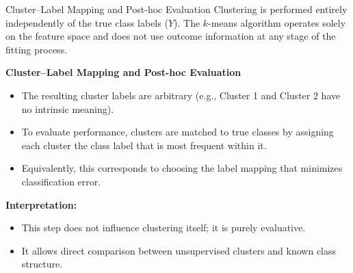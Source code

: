 \documentclass[8pt, aspectratio=169]{beamer}
\begin{document}
\begin{frame}{Cluster--Label Mapping and Post-hoc Evaluation}
\small
Clustering is performed entirely independently of the true class labels ($Y$). The $k$-means algorithm operates solely on the feature space and does not use outcome information at any stage of the fitting process.

\vspace{0.5em}
\textbf{Cluster--Label Mapping and Post-hoc Evaluation}
\begin{itemize}
    \item The resulting cluster labels are arbitrary (e.g., Cluster 1 and Cluster 2 have no intrinsic meaning).
    \item To evaluate performance, clusters are matched to true classes by assigning each cluster the class label that is most frequent within it.
    \item Equivalently, this corresponds to choosing the label mapping that minimizes classification error.
\end{itemize}

\vspace{0.5em}
\textbf{Interpretation:}
\begin{itemize}
    \item This step does not influence clustering itself; it is purely evaluative.
    \item It allows direct comparison between unsupervised clusters and known class structure.
\end{itemize}
\end{frame}
\end{document}
